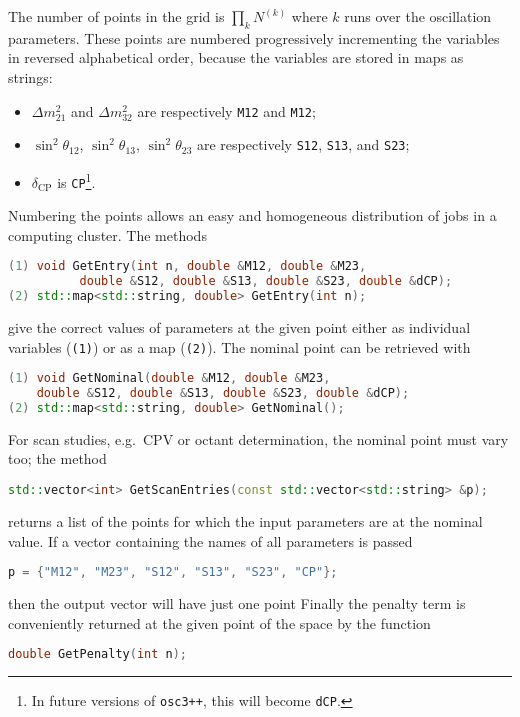 \documentclass[a4paper, 11pt]{article}
\begin{document}
The number of points in the grid is $\prod_k N^{(k)}$ where $k$ runs over the oscillation parameters.
These points are numbered progressively incrementing the variables in reversed alphabetical order, because %
the variables are stored in maps as strings:
\begin{itemize}
	\item $\Delta m^2_{21}$ and $\Delta m^2_{32}$ are respectively \texttt{M12} and \texttt{M12};
	\item $\sin^2\theta_{12}$, $\sin^2 \theta_{13}$, $\sin^2 \theta_{23}$ are respectively \texttt{S12}, \texttt{S13}, %
		and \texttt{S23};
	\item $\delta_\text{CP}$ is \texttt{CP}\footnote{In future versions of \texttt{osc3++}, this will become \texttt{dCP}.}.
\end{itemize}
Numbering the points allows an easy and homogeneous distribution of jobs in a computing cluster.
The methods
\begin{lstlisting}[language=C++]
(1) void GetEntry(int n, double &M12, double &M23,
		  double &S12, double &S13, double &S23, double &dCP);
(2) std::map<std::string, double> GetEntry(int n);
\end{lstlisting}
give the correct values of parameters at the given point either as individual variables (\texttt{(1)}) or as a map (\texttt{(2)}).
The nominal point can be retrieved with
\begin{lstlisting}[language=C++]
(1) void GetNominal(double &M12, double &M23,
	double &S12, double &S13, double &S23, double &dCP);
(2) std::map<std::string, double> GetNominal();
\end{lstlisting}
For scan studies, e.g.\ CPV or octant determination, the nominal point must vary too; %
the method 
\begin{lstlisting}[language=C++]
    std::vector<int> GetScanEntries(const std::vector<std::string> &p);
\end{lstlisting}
returns a list of the points for which the input parameters are at the nominal value.
If a vector containing the names of all parameters is passed
\begin{lstlisting}[language=C++]
    p = {"M12", "M23", "S12", "S13", "S23", "CP"};
\end{lstlisting}
then the output vector will have just one point
Finally the penalty term is conveniently returned at the given point of the space by the function
\begin{lstlisting}[language=C++]
    double GetPenalty(int n);
\end{lstlisting}
\end{document}
